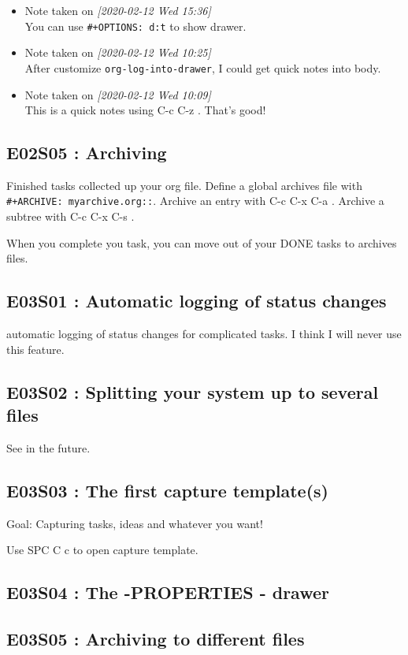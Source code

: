 \documentclass[11pt]{article}
\begin{document}
\begin{itemize}
\item Note taken on \textit{[2020-02-12 Wed 15:36] } \\
You can use \texttt{\#+OPTIONS: d:t} to show drawer.
\item Note taken on \textit{[2020-02-12 Wed 10:25] } \\
After customize \texttt{org-log-into-drawer}, I could get quick notes into body.
\item Note taken on \textit{[2020-02-12 Wed 10:09] } \\
This is a quick notes using  C-c C-z  . That's good!
\end{itemize}

\subsection{E02S05 : Archiving}
\label{sec:orgeeb65ae}
Finished tasks collected up your org file. Define a global archives file with
\texttt{\#+ARCHIVE: myarchive.org::}. Archive an entry with  C-c C-x
C-a  . Archive a subtree with  C-c C-x C-s  .

When you complete you task, you can move out of your DONE tasks to archives files.

\subsection{E03S01 : Automatic logging of status changes}
\label{sec:org7ba114e}
automatic logging of status changes for complicated tasks. I think I will
never use this feature.
\subsection{E03S02 : Splitting your system up to several files}
\label{sec:org1d3b9bb}
See in the future.
\subsection{E03S03 : The first capture template(s)}
\label{sec:orgdf3497e}
Goal: Capturing tasks, ideas and whatever you want!

Use  SPC C c  to open capture template.
\subsection{E03S04 : The  -PROPERTIES - drawer}
\label{sec:org1c8a933}
\subsection{E03S05 : Archiving to different files}
\label{sec:orgedb8936}
\end{document}
